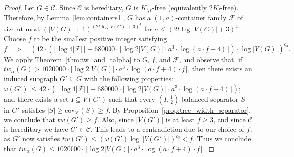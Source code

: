 \documentclass[11pt]{amsart}
\newcommand{\tw}{tw\xspace}
\newcommand{\atw}{tw_{\alpha}\xspace}
\begin{document}
\begin{proof}
    Let $G \in \mathcal{C}$. Since $\mathcal{C}$ is hereditary, $G$ is  $K_{t,t}$-free (equivalently $\overline{2K_t}$-free). Therefore, by Lemma~\ref{lem:containers1}, $G$ has a $(1,a)$-container family $\mathcal{F}$ of size at most $({|V(G)|+1})^{(2t \log |V(G)| + 3)^4}$ for $a \leq (2t \log |V(G)| + 3)^4$. Choose $f$ to be the smallest positive integer satisfying 
    $$
    f \quad > \quad ({ 42} \cdot (\lceil\log 4|\mathcal{F}|\rceil + 680000 \cdot \lceil \log 2|V(G)| \cdot a^3 \cdot { \log(a\cdot f + 4)}\rceil) \cdot \log |V(G)|)^{c_3}.
    $$
    We apply Theorem~\ref{thm:tw_and_talpha} to $G$, $f$, and $\mathcal{F}$, and observe that, if $\atw(G) > 1020000 \cdot \lceil \log 2|V(G)| \cdot a^3 \cdot { \log(a\cdot f + 4)} \cdot f \rceil$, then there exists an induced subgraph $G' \subseteq G$ with the following properties: $\omega(G')\, \leq\, { 42} \cdot (\lceil\log 4|\mathcal{F}|\rceil + 680000 \cdot \lceil \log 2|V(G)| \cdot a^3 \cdot { \log(a\cdot f + 4)}\rceil)$; and there exists a set $I \subseteq V(G')$ such that every $(I,\frac{1}{2})$-balanced separator $S$ in $G'$ satisfies $|S| \geq \mathrm{cov}_{\mathcal{F}}(S) \geq f$. By Proposition~\ref{prop:tree_width_separator}, we conclude that $\tw(G') \geq f$. Also, since $|V(G')|$ is at least $f \geq 3$, and since $\mathcal{C}$ is hereditary we have $G'\in\mathcal{C}$. This leads to a contradiction due to our choice of $f$, as $G'$ now satisfies $\tw(G') \leq (\omega(G')\log\, |V(G')|)^{c_3} < f$. Thus we conclude that $\atw(G) \leq 1020000 \cdot \lceil \log 2|V(G)| \cdot a^3 \cdot { \log(a\cdot f + 4)} \cdot f \rceil$.
    
    

\end{proof}
\end{document}
